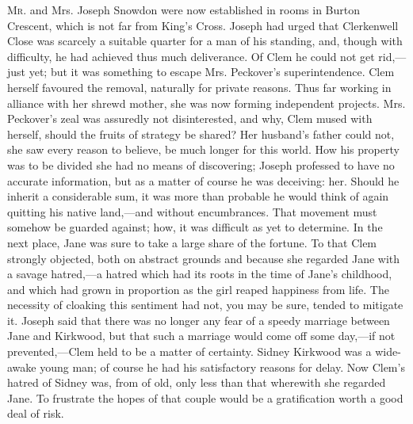 \textsc{Mr.} and Mrs. Joseph Snowdon were now established in rooms in
Burton Crescent, which is not far from King's Cross. Joseph had urged
that Clerkenwell Close was scarcely a suitable quarter for a man of his
standing, and, though with difficulty, he had achieved thus much
deliverance. Of Clem he could not get rid,---just yet; but it was
something to escape Mrs. Peckover's superintendence. Clem herself
favoured the removal, naturally for private reasons. Thus far working in
alliance with her shrewd mother, she was now forming independent
projects. Mrs. Peckover's zeal was assuredly not disinterested, and why,
Clem mused with herself, should the fruits of strategy be shared? Her
husband's father could not, she saw every reason to believe, be much
longer for this world. How his property
{\protect\hypertarget{25}{}{}}was to be divided she had no means of
discovering; Joseph professed to have no accurate information, but as a
matter of course he was deceiving: her. Should he inherit a considerable
sum, it was more than probable he would think of again quitting his
native land,---and without encumbrances. That movement must somehow be
guarded against; how, it was difficult as yet to determine. In the next
place, Jane was sure to take a large share of the fortune. To that Clem
strongly objected, both on abstract grounds and because she regarded
Jane with a savage hatred,---a hatred which had its roots in the time of
Jane's childhood, and which had grown in proportion as the girl reaped
happiness from life. The necessity of cloaking this sentiment had not,
you may be sure, tended to mitigate it. Joseph said that there was no
longer any fear of a speedy marriage between Jane and Kirkwood, but that
such a marriage would come off some day,---if not prevented,---Clem held
to be a matter of certainty. Sidney Kirkwood was a wide-awake young man;
of course he had his satisfactory reasons for delay. Now Clem's hatred
of Sidney was, from of old, only less than that
{\protect\hypertarget{26}{}{}}wherewith she regarded Jane. To frustrate
the hopes of that couple would be a gratification worth a good deal of
risk.

